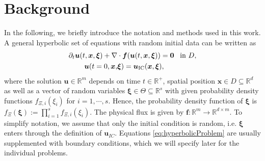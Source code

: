 \section{Background}
\label{sec:background}
In the following, we briefly introduce the notation and methods used in this work. A general hyperbolic set of equations with random initial data can be written as
\begin{subequations}\label{eq:hyperbolicProblem}
\begin{align}
\partial_t \bm{u}(t,\bm{x},\bm{\xi}) + \nabla&\cdot\bm{f}(\bm{u}(t,\bm{x},\bm{\xi})) = \bm{0} \enskip \text{ in } D, \\ \label{eq:ic}
\bm{u}(t=0,\bm{x},&\bm{\xi}) = \bm{u}_{\text{IC}}(\bm{x},\bm{\xi}),
\end{align}
\end{subequations}
where the solution $\bm u\in\mathbb{R}^m$ depends on time $t\in\mathbb{R}^+$, spatial position $\bm{x}\in D\subseteq \mathbb{R}^d$ as well as a vector of random variables $\bm{\xi}\in\Theta\subseteq\mathbb{R}^s$ with given probability density functions $f_{\Xi,i}(\xi_i)$ for $i = 1,\cdots,s$. Hence, the probability density function of $\bm{\xi}$ is $f_{\Xi}(\bm\xi):=\prod_{i=1}^s f_{\Xi,i}(\xi_i)$. The physical flux is given by $\bm{f}:\mathbb{R}^m\to\mathbb{R}^{d\times m}$. To simplify notation, we assume that only the initial condition is random, i.e. $\bm{\xi}$ enters through the definition of $\bm{u}_{IC}$. Equations \eqref{eq:hyperbolicProblem} are usually supplemented with boundary conditions, which we will specify later for the individual problems.

